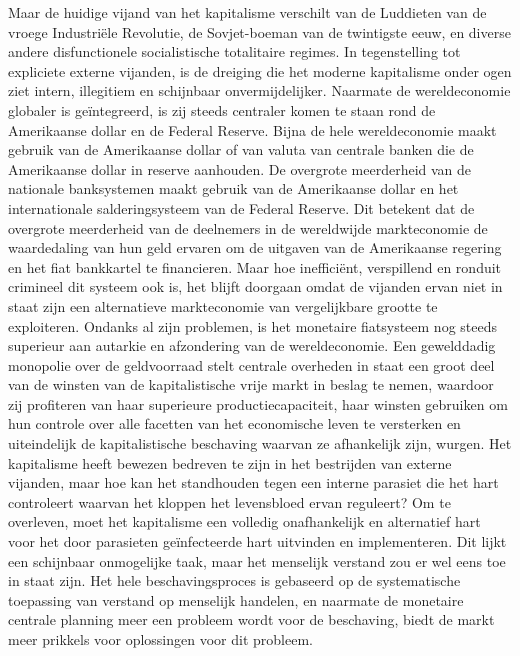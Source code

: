 \documentclass[
  a5paper,
  smalldemyvopaper,11pt,twoside,onecolumn,openright,extrafontsizes,
hidelinks]{memoir}
\begin{document}
Maar de huidige vijand van het kapitalisme verschilt van de Luddieten
van de vroege Industriële Revolutie, de Sovjet-boeman van de twintigste
eeuw, en diverse andere disfunctionele socialistische totalitaire
regimes. In tegenstelling tot expliciete externe vijanden, is de
dreiging die het moderne kapitalisme onder ogen ziet intern, illegitiem
en schijnbaar onvermijdelijker. Naarmate de wereldeconomie globaler is
geïntegreerd, is zij steeds centraler komen te staan rond de Amerikaanse
dollar en de Federal Reserve. Bijna de hele wereldeconomie maakt gebruik
van de Amerikaanse dollar of van valuta van centrale banken die de
Amerikaanse dollar in reserve aanhouden. De overgrote meerderheid van de
nationale banksystemen maakt gebruik van de Amerikaanse dollar en het
internationale salderingsysteem van de Federal Reserve. Dit betekent dat
de overgrote meerderheid van de deelnemers in de wereldwijde
markteconomie de waardedaling van hun geld ervaren om de uitgaven van de
Amerikaanse regering en het fiat bankkartel te financieren. Maar hoe
inefficiënt, verspillend en ronduit crimineel dit systeem ook is, het
blijft doorgaan omdat de vijanden ervan niet in staat zijn een
alternatieve markteconomie van vergelijkbare grootte te exploiteren.
Ondanks al zijn problemen, is het monetaire fiatsysteem nog steeds
superieur aan autarkie en afzondering van de wereldeconomie. Een
gewelddadig monopolie over de geldvoorraad stelt centrale overheden in
staat een groot deel van de winsten van de kapitalistische vrije markt
in beslag te nemen, waardoor zij profiteren van haar superieure
productiecapaciteit, haar winsten gebruiken om hun controle over alle
facetten van het economische leven te versterken en uiteindelijk de
kapitalistische beschaving waarvan ze afhankelijk zijn, wurgen. Het
kapitalisme heeft bewezen bedreven te zijn in het bestrijden van externe
vijanden, maar hoe kan het standhouden tegen een interne parasiet die
het hart controleert waarvan het kloppen het levensbloed ervan
reguleert? Om te overleven, moet het kapitalisme een volledig
onafhankelijk en alternatief hart voor het door parasieten geïnfecteerde
hart uitvinden en implementeren. Dit lijkt een schijnbaar onmogelijke
taak, maar het menselijk verstand zou er wel eens toe in staat zijn. Het
hele beschavingsproces is gebaseerd op de systematische toepassing van
verstand op menselijk handelen, en naarmate de monetaire centrale
planning meer een probleem wordt voor de beschaving, biedt de markt meer
prikkels voor oplossingen voor dit probleem.
\end{document}
